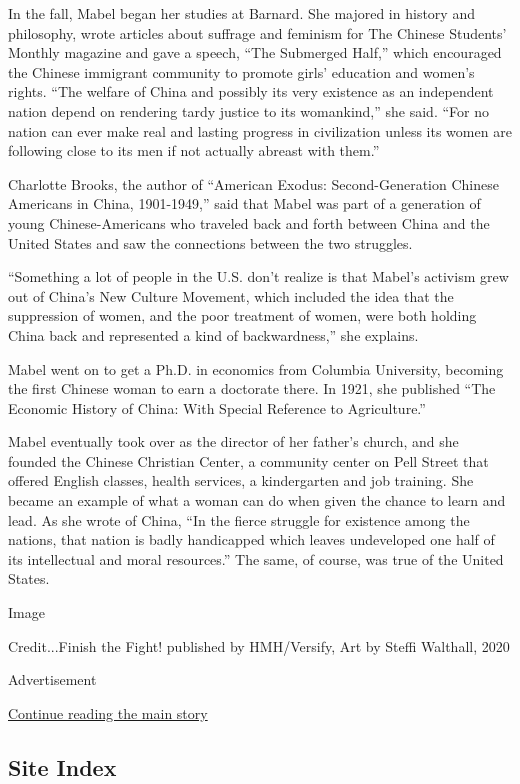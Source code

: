 In the fall, Mabel began her studies at Barnard. She majored in history
and philosophy, wrote articles about suffrage and feminism for The
Chinese Students' Monthly magazine and gave a speech, ``The Submerged
Half,'' which encouraged the Chinese immigrant community to promote
girls' education and women's rights. ``The welfare of China and possibly
its very existence as an independent nation depend on rendering tardy
justice to its womankind,'' she said. ``For no nation can ever make real
and lasting progress in civilization unless its women are following
close to its men if not actually abreast with them.''

Charlotte Brooks, the author of ``American Exodus: Second-Generation
Chinese Americans in China, 1901-1949,'' said that Mabel was part of a
generation of young Chinese-Americans who traveled back and forth
between China and the United States and saw the connections between the
two struggles.

``Something a lot of people in the U.S. don't realize is that Mabel's
activism grew out of China's New Culture Movement, which included the
idea that the suppression of women, and the poor treatment of women,
were both holding China back and represented a kind of backwardness,''
she explains.

Mabel went on to get a Ph.D. in economics from Columbia University,
becoming the first Chinese woman to earn a doctorate there. In 1921, she
published ``The Economic History of China: With Special Reference to
Agriculture.''

Mabel eventually took over as the director of her father's church, and
she founded the Chinese Christian Center, a community center on Pell
Street that offered English classes, health services, a kindergarten and
job training. She became an example of what a woman can do when given
the chance to learn and lead. As she wrote of China, ``In the fierce
struggle for existence among the nations, that nation is badly
handicapped which leaves undeveloped one half of its intellectual and
moral resources.'' The same, of course, was true of the United States.

Image

Credit...Finish the Fight! published by HMH/Versify, Art by Steffi
Walthall, 2020

Advertisement

\protect\hyperlink{after-bottom}{Continue reading the main story}

\hypertarget{site-index}{%
\subsection{Site Index}\label{site-index}}

